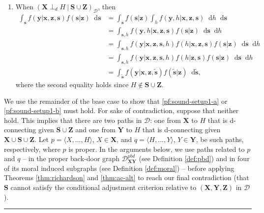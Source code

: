 \documentclass[twoside]{article}
\newcommand{\dpbd}[2][G]{\mathcal{D}_{\mb{#2}}^{pbd}}
\newcommand\given[1][]{\:#1\vert\:}
\newcommand{\mb}[1]{\mathbf{#1}}
\newcommand{\dsepp}{\perp_{d}}
\newcommand{\g}[1][G]{\mathcal{#1}}
\newcommand*\diff{\mathop{}\!\mathrm{d}}
\newenvironment{proofof}[1][]{\begin{trivlist}
\item[\hskip \labelsep {\bfseries Proof of #1.}]}{\hfill\BlackBox\end{trivlist}}
\newcommand{\BlackBox}{\rule{1.5ex}{1.5ex}}
\begin{document}
\begin{proofof}[Lemma \ref{lem:sound-setup1}]
\begin{enumerate}[label=\emph{(\alph*)}]
        \item \label{pf:sound-setup1-b}
        When $(\mb{X} \dsepp H \given \mb{S} \cup \mb{Z})_{\g[D]}$, then 
        \begin{align}
            \int_\mb{s} f(\mb{y} | \mb{x,z,s})f(\mb{s} | \mb{z}) \diff \mb{s} 
                &= \int_{\mb{s}}f(\mb{s} | \mb{z})\int_{h} f(\mb{y},h | \mb{x,z,s}) \diff h \diff \mb{s} \nonumber \\
                &= \int_{\mb{s},h} f(\mb{y},h | \mb{x,z,s})f(\mb{s} | \mb{z}) \diff \mb{s} \diff h \nonumber \\
                &= \int_{\mb{s},h} f(\mb{y} | \mb{x,z,s},h)f(h | \mb{x,z,s})f(\mb{s} | \mb{z}) \diff \mb{s} \diff h \nonumber \\
                &= \int_{\mb{s},h} f(\mb{y} | \mb{x,z,s},h)f(h | \mb{z,s})f(\mb{s} | \mb{z}) \diff \mb{s} \diff h \nonumber \\
                &= \int_{\mb{\tilde{s}}} f(\mb{y} | \mb{x,z,\tilde{s}}) f(\mb{\tilde{s}} | \mb{z}) \diff \mb{\tilde{s}}, \nonumber 
        \end{align}
        where the second equality holds since $H \notin \mb{S} \cup \mb{Z}$.
    \end{enumerate}

    We use the remainder of the base case to show that \ref{pf:sound-setup1-a} or \ref{pf:sound-setup1-b} must hold. For sake of contradiction, suppose that neither hold. This implies that there are two paths in $\g[D]$: one from $\mb{X}$ to $H$ that is d-connecting given $\mb{S} \cup \mb{Z}$ and one from $\mb{Y}$ to $H$ that is d-connecting given $\mb{X} \cup \mb{S} \cup \mb{Z}$. Let $p=\langle X, \ldots, H \rangle$, $X \in \mb{X}$, and $q=\langle H, \ldots, Y \rangle$, $Y \in \mb{Y}$, be such paths, respectively, where $p$ is proper. In the arguments below, we use paths related to $p$ and $q$ -- in the proper back-door graph $\dpbd{\mb{XY}}$ (see Definition \ref{def:pbd}) and in four of its moral induced subgraphs (see Definition \ref{def:moral}) -- before applying Theorems \ref{thm:richardson} and \ref{thm:ac-alt} to reach our final contradiction (that $\mb{S}$ cannot satisfy the conditional adjustment criterion relative to $(\mb{X,Y,Z})$ in $\g[D]$).


\end{proofof}
\end{document}
